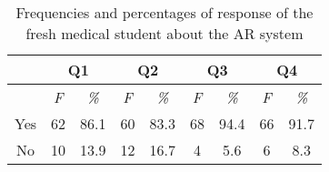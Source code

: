 \begin{table}
	\caption[User study with fresh medical students]{Frequencies and percentages of response of the fresh medical student about the AR system}
	\centering
	\label{tb:3-MMC:userStudy}
	\scriptsize
	\begin{center}
		\begin{tabular}{ccccccccc}
			\multicolumn{1}{c}{\space} & \multicolumn{2}{c}{\textbf{Q1}} & \multicolumn{2}{c}{\textbf{Q2}} & \multicolumn{2}{c}{\textbf{Q3}} & \multicolumn{2}{c}{\textbf{Q4}} \\
			\hline
			\space & \textit{F} &\textit{\%}& \textit{F} &\textit{\%}& \textit{F} &\textit{\%}& \textit{F} &\textit{\%} \\
			Yes & 62 & 86.1 & 60 & 83.3 & 68 & 94.4 & 66 & 91.7 \\
			No & 10 & 13.9 & 12 & 16.7 & 4 & 5.6 & 6 & 8.3 \\
			\hline
		\end{tabular}
	\end{center}
\end{table}